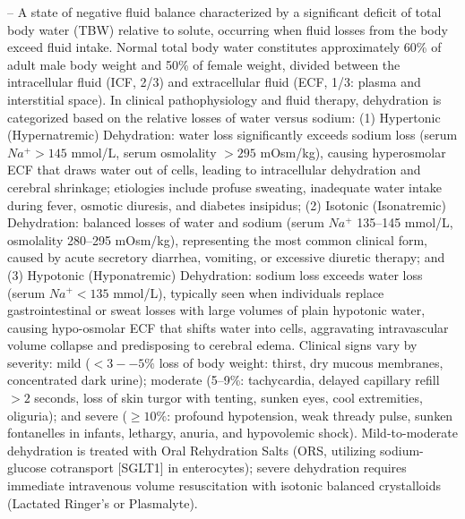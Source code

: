 -- A state of negative fluid balance characterized by a significant deficit of total body water (TBW) relative to solute, occurring when fluid losses from the body exceed fluid intake. Normal total body water constitutes approximately 60\% of adult male body weight and 50\% of female weight, divided between the intracellular fluid (ICF, 2/3) and extracellular fluid (ECF, 1/3: plasma and interstitial space). In clinical pathophysiology and fluid therapy, dehydration is categorized based on the relative losses of water versus sodium: (1) Hypertonic (Hypernatremic) Dehydration: water loss significantly exceeds sodium loss (serum $Na^+ > 145$ mmol/L, serum osmolality $>295$ mOsm/kg), causing hyperosmolar ECF that draws water out of cells, leading to intracellular dehydration and cerebral shrinkage; etiologies include profuse sweating, inadequate water intake during fever, osmotic diuresis, and diabetes insipidus; (2) Isotonic (Isonatremic) Dehydration: balanced losses of water and sodium (serum $Na^+$ 135--145 mmol/L, osmolality 280--295 mOsm/kg), representing the most common clinical form, caused by acute secretory diarrhea, vomiting, or excessive diuretic therapy; and (3) Hypotonic (Hyponatremic) Dehydration: sodium loss exceeds water loss (serum $Na^+ < 135$ mmol/L), typically seen when individuals replace gastrointestinal or sweat losses with large volumes of plain hypotonic water, causing hypo-osmolar ECF that shifts water into cells, aggravating intravascular volume collapse and predisposing to cerebral edema. Clinical signs vary by severity: mild ($<3--5\%$ loss of body weight: thirst, dry mucous membranes, concentrated dark urine); moderate (5--9\%: tachycardia, delayed capillary refill $>2$ seconds, loss of skin turgor with tenting, sunken eyes, cool extremities, oliguria); and severe ($\ge 10\%$: profound hypotension, weak thready pulse, sunken fontanelles in infants, lethargy, anuria, and hypovolemic shock). Mild-to-moderate dehydration is treated with Oral Rehydration Salts (ORS, utilizing sodium-glucose cotransport [SGLT1] in enterocytes); severe dehydration requires immediate intravenous volume resuscitation with isotonic balanced crystalloids (Lactated Ringer's or Plasmalyte).

